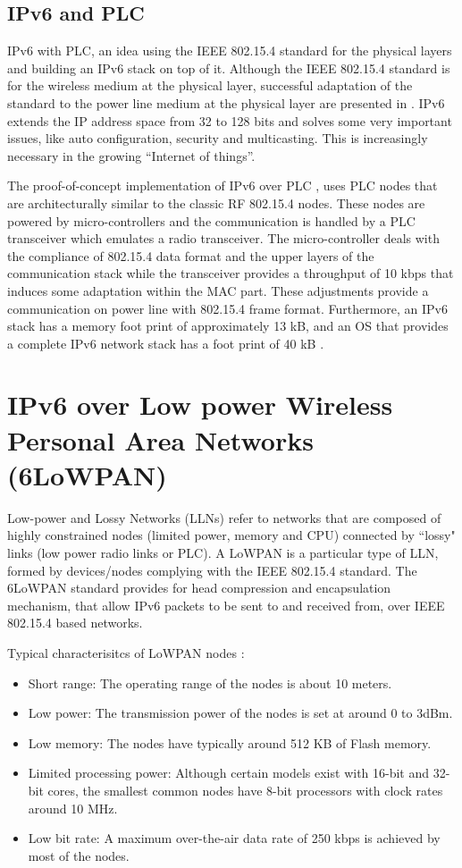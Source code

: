 \subsection{IPv6 and PLC}

IPv6 with PLC, an idea using the IEEE 802.15.4 standard \cite{IEEE_802.15} for the physical layers and building an IPv6 stack on top of it. Although the IEEE 802.15.4 standard is for the wireless medium at the physical layer, successful adaptation of the standard to the power line medium at the physical layer are presented in \cite{IP_PLC}. IPv6 extends the IP address space from 32 to 128 bits and solves some very important issues, like auto configuration, security and multicasting. This is increasingly necessary in the growing “Internet of things”.

The proof-of-concept implementation of IPv6 over PLC \cite{IP_PLC}, uses PLC nodes that are architecturally similar to the classic RF 802.15.4 nodes. These nodes are powered by micro-controllers and the communication is handled by a PLC transceiver which emulates a radio transceiver. The micro-controller deals with the compliance of 802.15.4 data format and the upper layers of the communication stack while the transceiver provides a throughput of 10 kbps that induces some adaptation within the MAC part. These adjustments provide a communication on power line with 802.15.4 frame format. Furthermore, an IPv6 stack has a memory foot print of approximately 13 kB, and an OS that provides a complete IPv6 network stack has a foot print of 40 kB \cite{IP_PLC}.

\section{IPv6 over Low power Wireless Personal Area Networks (6LoWPAN)}

Low-power and Lossy Networks (LLNs) refer to networks that are composed of highly constrained nodes (limited power, memory and CPU) connected by ``lossy" links (low power radio links or PLC). A LoWPAN is a particular type of LLN, formed by devices/nodes complying with the IEEE 802.15.4 standard. The 6LoWPAN standard provides for head compression and encapsulation mechanism, that allow IPv6 packets to be sent to and received from, over IEEE 802.15.4 based networks.

Typical characterisitcs of LoWPAN nodes \cite{6LPN_dna_draft,6LPN_prob_rfc}:
\begin{itemize}
\item Short range: The operating range of the nodes is about 10 meters.
\item Low power: The transmission power of the nodes is set at around 0 to 3dBm.
\item Low memory: The nodes have typically around 512 KB of Flash memory.
\item Limited processing power: Although certain models exist with 16-bit and 32-bit cores, the smallest common nodes have 8-bit processors with clock rates around 10 MHz.
\item Low bit rate: A maximum over-the-air data rate of 250 kbps is achieved by most of the nodes.
\end{itemize}

